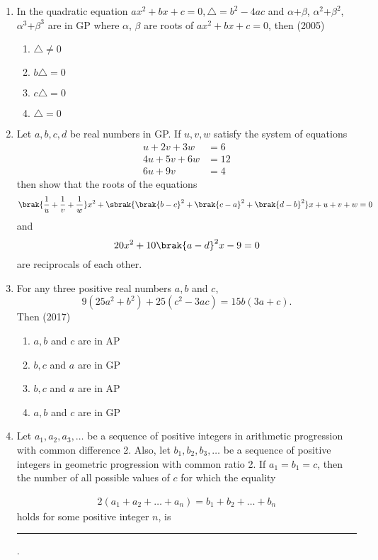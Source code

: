 \begin{enumerate}[label=\thesubsection.\arabic*,ref=\thesubsection.\theenumi]
\begin{multicols}{4}
\begin{enumerate}
            \end{enumerate}
            \end{multicols}
\item In the quadratic equation $ax^2+bx+c=0, \triangle=b^2-4ac$ and $\alpha$+$\beta$, $\alpha^2$+$\beta^2$, $\alpha^3$+$\beta^3$ are in GP where $\alpha$, $\beta $ are roots of $ax^2+bx+c=0$, then \hfill(2005)
                \begin{multicols}{4}
\begin{enumerate}    
                    \item $\triangle\neq0$
                    \item $b\triangle=0$
                    \item $c\triangle=0$
                    \item $\triangle=0$
                \end{enumerate}
                \end{multicols}
      \item  Let $ a, b, c, d $ be real numbers in GP. If $u, v, w$ satisfy the system of equations  
%    
	      \hfill {}
%      
\begin{align*}
	u+2v+3w&=6  
	  \\
	  4u+5v+6w&=12 
	  \\
	  6u+9v&=4 
\end{align*}
      then show that the roots of the equations 
		$$\brak{\frac{1}{u}+\frac{1}{v}+\frac{1}{w}}x^{2}+\sbrak{\brak{b-c}^{2}+\brak{c-a}^{2}+\brak{d-b}^{2}}x+u+v+w=0 $$ and $$ 20x^{2}+10\brak{a-d}^{2}x-9=0 $$ are reciprocals of each other.
 \item For any three positive real numbers $a, b$ and $c$,  $$9(25a^2+b^2)+ 25(c^2-3ac) = 15b(3a+c).$$ Then \hfill (2017)
	 \begin{multicols}{2}
\begin{enumerate}    
  \item$a, b$ and $c$ are in AP
  \item{$b, c$ and $a$ are in GP}
  \columnbreak
  \item $b, c$ and $a$ are in AP
  \item{$a, b$ and $c$ are in GP}
  \end{enumerate}
  \end{multicols}
\item       Let $a_1, a_2, a_3, \dots $ be a sequence of positive integers in arithmetic progression with common difference 2. Also, let $b_1, b_2, b_3, \dots $ be a sequence of positive integers in geometric progression with common ratio 2. If $a_1 = b_1 = c$, then the number of all possible values of $c$ for which the equality 

\begin{align*}
     2(a_1 + a_2 + \dots + a_n) = b_1 + b_2 + \dots + b_n
\end{align*}
    holds for some positive integer $n$, is \rule{1cm}{0.1pt}.
\hfill {}
\end{enumerate}


